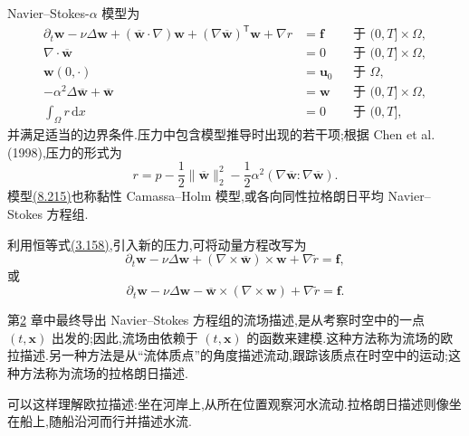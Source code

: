 \begin{note}
\label{note:navier-stokes-alpha-model}
Navier--Stokes-$\alpha$ 模型为
\begin{equation}\label{eq:navier-stokes-alpha-model}
\begin{aligned}
 \partial_t\bm{w}-\nu\Delta\bm{w}
  +(\overline{\bm{w}}\cdot\nabla)\bm{w}
  +(\nabla\overline{\bm{w}})^{\mathsf T}\bm{w}
  +\nabla r&=\bm{f}
  &&\text{于 }(0,T]\times\Omega,\\
 \nabla\cdot\overline{\bm{w}}&=0
  &&\text{于 }(0,T]\times\Omega,\\
 \bm{w}(0,\cdot)&=\bm{u}_0
  &&\text{于 }\Omega,\\
 -\alpha^2\Delta\overline{\bm{w}}+\overline{\bm{w}}
  &=\bm{w}
  &&\text{于 }(0,T]\times\Omega,\\
 \int_\Omega r\,\mathrm{d}x&=0
  &&\text{于 }(0,T],
\end{aligned}
\end{equation}
并满足适当的边界条件.压力中包含模型推导时出现的若干项;根据 Chen et al. (1998),压力的形式为
\[
 r=p-\frac12\|\overline{\bm{w}}\|_2^2
   -\frac12\alpha^2
    (\nabla\overline{\bm{w}}:\nabla\overline{\bm{w}}).
\]
模型\hyperref[eq:navier-stokes-alpha-model]{(8.215)}也称黏性 Camassa--Holm 模型,或各向同性拉格朗日平均 Navier--Stokes 方程组.

利用恒等式\hyperref[eq:curl-cross-product-identity]{(3.158)},引入新的压力,可将动量方程改写为
\begin{equation}\label{eq:navier-stokes-alpha-rotational-form}
 \partial_t\bm{w}-\nu\Delta\bm{w}
  +(\nabla\times\overline{\bm{w}})\times\bm{w}
  +\nabla\widetilde r=\bm{f},
\end{equation}
或
\begin{equation}\label{eq:navier-stokes-alpha-rotational-form-alternative}
 \partial_t\bm{w}-\nu\Delta\bm{w}
  -\overline{\bm{w}}\times(\nabla\times\bm{w})
  +\nabla\widetilde r=\bm{f}.
\end{equation}
\end{note}

\begin{note}[流场的拉格朗日描述]
\label{note:lagrangian-description-flow}
第\hyperref[chap:navier-stokes]{2} 章中最终导出 Navier--Stokes 方程组的流场描述,是从考察时空中的一点 $(t,\bm{x})$ 出发的;因此,流场由依赖于 $(t,\bm{x})$ 的函数来建模.这种方法称为流场的欧拉描述.另一种方法是从“流体质点”的角度描述流动,跟踪该质点在时空中的运动;这种方法称为流场的拉格朗日描述.

可以这样理解欧拉描述:坐在河岸上,从所在位置观察河水流动.拉格朗日描述则像坐在船上,随船沿河而行并描述水流.
\end{note}

